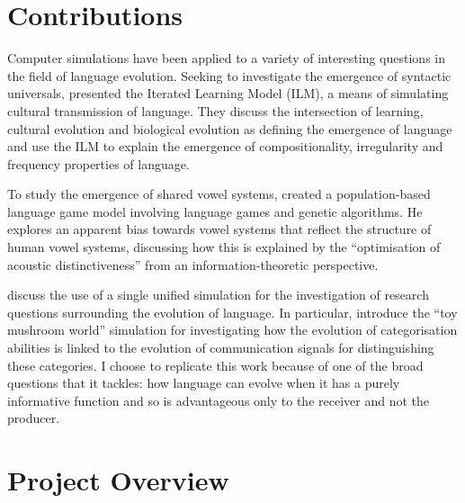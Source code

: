 \documentclass[12pt,a4paper]{report}
\begin{document}
\section{Contributions}

Computer simulations have been applied to a variety of interesting questions in the field of language evolution. Seeking to investigate the emergence of syntactic universals, \citet{kirby2002emergence} presented the Iterated Learning Model (ILM), a means of simulating cultural transmission of language. They discuss the intersection of learning, cultural evolution and biological evolution as defining the emergence of language and use the ILM to explain the emergence of compositionality, irregularity and frequency properties of language.

To study the emergence of shared vowel systems, \citet{de1997generating} created a population-based language game model involving language games and genetic algorithms. He explores an apparent bias towards vowel systems that reflect the structure of human vowel systems, discussing how this is explained by the ``optimisation of acoustic distinctiveness'' from an information-theoretic perspective.

\citet{parisi2002unified} discuss the use of a single unified simulation for the investigation of research questions surrounding the evolution of language. In particular, \citet{Cangelosi1998} introduce the ``toy mushroom world'' simulation for investigating how the evolution of categorisation abilities is linked to the evolution of communication signals for distinguishing these categories. I choose to replicate this work because of one of the broad questions that it tackles: how language can evolve when it has a purely informative function and so is advantageous only to the receiver and not the producer. 


\section{Project Overview}
\end{document}
